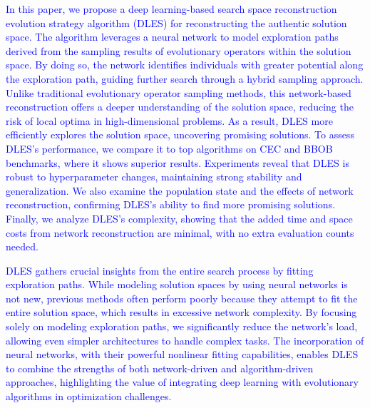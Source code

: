\documentclass[journal,twoside]{IEEEtran}
\begin{document}
\textcolor{blue}{
In this paper, we propose a deep learning-based search space reconstruction evolution strategy algorithm (DLES) for reconstructing the authentic solution space. The algorithm leverages a neural network to model exploration paths derived from the sampling results of evolutionary operators within the solution space. By doing so, the network identifies individuals with greater potential along the exploration path, guiding further search through a hybrid sampling approach. Unlike traditional evolutionary operator sampling methods, this network-based reconstruction offers a deeper understanding of the solution space, reducing the risk of local optima in high-dimensional problems. As a result, DLES more efficiently explores the solution space, uncovering promising solutions. To assess DLES's performance, we compare it to top algorithms on CEC and BBOB benchmarks, where it shows superior results. Experiments reveal that DLES is robust to hyperparameter changes, maintaining strong stability and generalization. We also examine the population state and the effects of network reconstruction, confirming DLES’s ability to find more promising solutions. Finally, we analyze DLES's complexity, showing that the added time and space costs from network reconstruction are minimal, with no extra evaluation counts needed.}

\textcolor{blue}{
DLES gathers crucial insights from the entire search process by fitting exploration paths. While modeling solution spaces by using neural networks is not new, previous methods often perform poorly because they attempt to fit the entire solution space, which results in excessive network complexity. By focusing solely on modeling exploration paths, we significantly reduce the network's load, allowing even simpler architectures to handle complex tasks. The incorporation of neural networks, with their powerful nonlinear fitting capabilities, enables DLES to combine the strengths of both network-driven and algorithm-driven approaches, highlighting the value of integrating deep learning with evolutionary algorithms in optimization challenges. }
\end{document}
